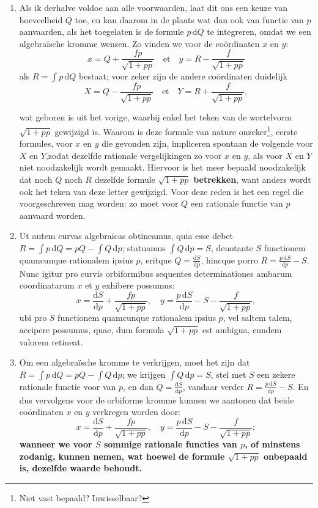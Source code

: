 \documentclass[10pt,a4paper]{article}
\newcommand{\switchenum}{\setcounter{enumi}{\arabic{enumi}-1}\switchcolumn}
\def\D{\mathrm{d}}
\begin{document}
\begin{paracol}{2}
\begin{enumerate}[topsep=1px]
		\switchenum
		\item Als ik derhalve voldoe aan alle voorwaarden, laat dit ons een keuze van hoeveelheid $Q$ toe, en kan daarom in de plaats wat dan ook van functie van $p$ aanvaarden, als het toegelaten is de formule $p\,\D Q$ te integreren, omdat we een algebraïsche kromme wensen. Zo vinden we voor de coördinaten $x$ en $y$:
		\[
			x = Q + \frac{fp}{\sqrt{1+pp}} \quad\text{et}\quad y = R - \frac{f}{\sqrt{1+pp}}
		\]
		als $R=\int p \,\D Q$ bestaat; voor zeker zijn de andere coördinaten duidelijk
		\[
			X = Q- \frac{fp}{\sqrt{1+pp}} \quad \text{et} \quad Y = R + \frac{f}{\sqrt{1+pp}},		
		\]
		
		\newpage
		
		wat geboren is uit het vorige, waarbij enkel het teken van de wortelvorm $\sqrt{1+pp}$ gewijzigd is. Waarom is deze formule van nature onzeker\footnote{Niet vast bepaald? Inwisselbaar?}, eerste formules, voor $x$ en $y$ die gevonden zijn, impliceren spontaan de volgende voor $X$ en $Y$,zodat dezelfde rationale vergelijkingen zo voor $x$ en $y$, als voor $X$ en $Y$ niet noodzakelijk wordt gemaakt. Hiervoor is het meer bepaald noodzakelijk dat noch $Q$ noch $R$ dezelfde formule $\sqrt{1+pp}$ \textbf{betrekken}, want anders wordt ook het teken van deze letter gewijzigd.  Voor deze reden is het een regel die voorgeschreven mag worden: zo moet voor $Q$ een rationale functie van $p$ aanvaard worden.
		
		
		\switchcolumn*
		
		\item Ut autem curvas algebraicas obtineamus, quia esse debet $R = \int p \,\D Q = pQ - \int Q \,\D p$; statuamus $\int Q \,\D p = S$, denotante $S$ functionem quamcunque rationalem ipsius $p$, eritque $Q = \frac{\D S}{\D p}$, hincque porro $R = \frac{p\,\D S}{\D p}-S$. Nunc igitur pro curvis orbiformibus sequentes determinationes ambarum coordinatarum $x$ et $y$ exhibere possumus:
		\[
			x = \frac{\D S}{\D p} + \frac{fp}{\sqrt{1+pp}}, \quad y = \frac{p\,\D S}{\D p} -S - \frac{f}{\sqrt{1+pp}},
		\]
		ubi pro $S$ functionem quamcunque rationalem ipsius $p$, vel saltem talem, accipere possumus, quae, dum formula $\sqrt{1+pp}$ est ambigua, eundem valorem retineat.
		
		\switchenum
		\item Om een algebraïsche kromme te verkrijgen, moet het zijn dat $R = \int p \,\D Q = pQ - \int Q \,\D p$; we krijgen  $\int Q \,\D p = S$, stel met $S$ een zekere rationale functie voor van $p$, en dan $Q = \frac{\D S}{\D p}$, vandaar verder $R = \frac{p\,\D S}{\D p}-S$. En dus vervolgens voor de orbiforme kromme kunnen we aantonen dat beide coördinaten $x$ en $y$ verkregen worden door: 
		\[
			x = \frac{\D S}{\D p} + \frac{fp}{\sqrt{1+pp}}, \quad y = \frac{p\,\D S}{\D p} -S - \frac{f}{\sqrt{1+pp}};
		\]
		\textbf{wanneer we voor $S$ sommige rationale functies van $p$, of minstens zodanig, kunnen nemen, wat hoewel de formule $\sqrt{1+pp}$ onbepaald is, dezelfde waarde behoudt.}
		

\end{enumerate}
\end{paracol}
\end{document}
